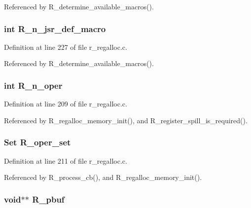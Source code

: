 Referenced by R\_\-determine\_\-available\_\-macros().
\subsubsection{\setlength{\rightskip}{0pt plus 5cm}int \bf{R\_\-n\_\-jsr\_\-def\_\-macro}}\label{r__regalloc_8h_e85156301a9d5d6aa120ee2af71d6855}




Definition at line 227 of file r\_\-regalloc.c.

Referenced by R\_\-determine\_\-available\_\-macros().
\subsubsection{\setlength{\rightskip}{0pt plus 5cm}int \bf{R\_\-n\_\-oper}}\label{r__regalloc_8h_86fc593893c798d2cc9a1f08f6c221bf}




Definition at line 209 of file r\_\-regalloc.c.

Referenced by R\_\-regalloc\_\-memory\_\-init(), and R\_\-register\_\-spill\_\-is\_\-required().
\subsubsection{\setlength{\rightskip}{0pt plus 5cm}\bf{Set} \bf{R\_\-oper\_\-set}}\label{r__regalloc_8h_0462961e38d1e52b29b2c1abd94565a6}




Definition at line 211 of file r\_\-regalloc.c.

Referenced by R\_\-process\_\-cb(), and R\_\-regalloc\_\-memory\_\-init().
\subsubsection{\setlength{\rightskip}{0pt plus 5cm}void$\ast$$\ast$ \bf{R\_\-pbuf}}\label{r__regalloc_8h_c477d4746f6efc32a6a33c4dd4697bb7}




